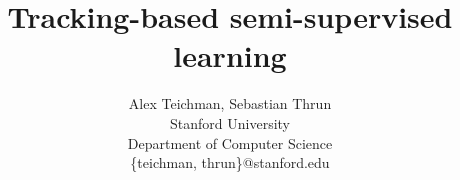 \documentclass[conference]{IEEEtran}
\begin{document}
\title{Tracking-based semi-supervised learning}

\author{Alex Teichman, Sebastian Thrun \\[0.25cm]
  Stanford University \\
  Department of Computer Science\\
\{teichman, thrun\}@stanford.edu}
\date{}






% 
\end{document}
